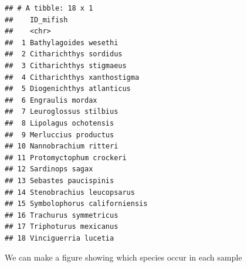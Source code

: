 \documentclass[
]{article}
\begin{document}
\begin{verbatim}
## # A tibble: 18 x 1
##    ID_mifish                   
##    <chr>                       
##  1 Bathylagoides wesethi       
##  2 Citharichthys sordidus      
##  3 Citharichthys stigmaeus     
##  4 Citharichthys xanthostigma  
##  5 Diogenichthys atlanticus    
##  6 Engraulis mordax            
##  7 Leuroglossus stilbius       
##  8 Lipolagus ochotensis        
##  9 Merluccius productus        
## 10 Nannobrachium ritteri       
## 11 Protomyctophum crockeri     
## 12 Sardinops sagax             
## 13 Sebastes paucispinis        
## 14 Stenobrachius leucopsarus   
## 15 Symbolophorus californiensis
## 16 Trachurus symmetricus       
## 17 Triphoturus mexicanus       
## 18 Vinciguerria lucetia
\end{verbatim}

We can make a figure showing which species occur in each sample
\end{document}
